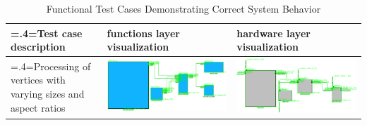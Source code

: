 \clearpage
\begin{table}[H]
    \caption{Functional Test Cases Demonstrating Correct System Behavior}
    \label{tab:functional_test_cases_no_errors}
    \begin{tabularx}{\textwidth}{@{}>{\hsize=.4\hsize\linewidth=\hsize}X m{} m{}@{}}
        \toprule
        Test case description & functions layer visualization & hardware layer visualization \\ 
        \midrule
        Processing of vertices with varying sizes and aspect ratios &  
        \includegraphics[width=\linewidth]{pictures/correct_task_size_input_clip.png} & 
        \includegraphics[width=\linewidth]{pictures/correct_task_size_output_clip.png} \\


\end{tabularx}
\end{table}
